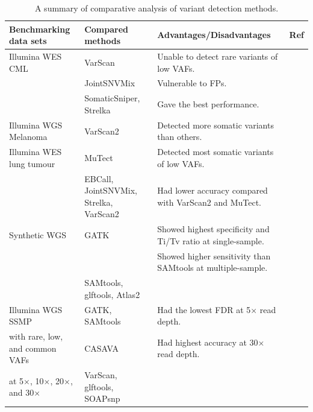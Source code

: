 \documentclass[a4,center,fleqn]{NAR}
\begin{document}
\begin{landscape}
\begin{table}[htbp]
  \centering
  \small
  \caption{A summary of comparative analysis of variant detection methods.}\label{tbl:comparison}
  \begin{threeparttable}
    \begin{tabular}{rlrr}
    \multicolumn{1}{l}{\textbf{Benchmarking data sets}} & \textbf{Compared methods} & \multicolumn{1}{l}{\textbf{Advantages/Disadvantages}} & \multicolumn{1}{l}{\textbf{Ref}} \\
    \toprule
    \multicolumn{1}{l}{Illumina WES  CML} & VarScan & \multicolumn{1}{l}{Unable to detect rare variants of low VAFs.} &~\citep{Roberts2013} \\
          & JointSNVMix & \multicolumn{1}{l}{Vulnerable to FPs.} &  \\
          & SomaticSniper, Strelka & \multicolumn{1}{l}{Gave the best performance.} &  \\

    \midrule
    \multicolumn{1}{l}{Illumina WGS Melanoma } & VarScan2 & \multicolumn{1}{l}{Detected more somatic variants than others.} &~\citep{wang2013detecting} \\
    \multicolumn{1}{l}{Illumina WES lung tumour} & MuTect & \multicolumn{1}{l}{Detected most somatic variants of low VAFs.} &  \\
          & EBCall, JointSNVMix, Strelka, VarScan2 & \multicolumn{1}{l}{Had lower accuracy compared with VarScan2 and MuTect.} &  \\

    \midrule
    \multicolumn{1}{l}{Synthetic WGS} & GATK  & \multicolumn{1}{l}{Showed highest specificity and Ti/Tv ratio at single-sample. } &~\citep{liu2013variant}\\
          &       & \multicolumn{1}{l}{Showed higher sensitivity than SAMtools at multiple-sample.} &  \\
          & SAMtools, glftools, Atlas2 &       &  \\

    \midrule
    \multicolumn{1}{l}{Illumina WGS SSMP} & GATK, SAMtools & \multicolumn{1}{l}{Had the lowest FDR at 5$\times$ read depth.} &~\citep{Cheng2014}\\
    \multicolumn{1}{l}{with rare, low, and common VAFs} & CASAVA & \multicolumn{1}{l}{Had highest accuracy at 30$\times$ read depth.} &  \\
    \multicolumn{1}{l}{at 5$\times$, 10$\times$, 20$\times$, and 30$\times$ } & VarScan, glftools, SOAPsnp &       &  \\


\end{tabular}
\end{threeparttable}
\end{table}
\end{landscape}
\end{document}
